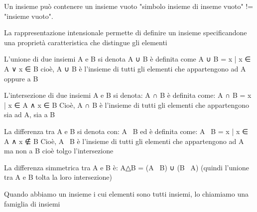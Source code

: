 Un insieme può contenere un insieme vuoto "simbolo insieme di inseme vuoto" != "insieme vuoto".

La rappresentazione intensionale permette di definire un insieme specificandone una proprietà
caratteristica che distingue gli elementi


L’unione di due insiemi A e B si denota A ∪ B
è definita come A ∪ B = {x | x ∈ A ∨ x ∈ B} 
cioè, A ∪ B è l’insieme di tutti gli elementi che appartengono ad A oppure a B 


L’intersezione di due insiemi A e B si denota: A ∩ B
è definita come:
A ∩ B = {x | x ∈ A ∧ x ∈ B}
Cioè, A ∩ B è l’insieme di tutti gli elementi che appartengono sia ad A, sia a B

La differenza tra A e B si denota con: A \ B
ed è definita come:
A \ B = { x | x ∈ A ∧ x ∉ B }
Cioè, A \ B è l’insieme di tutti gli elementi che appartengono ad A ma non a B 
cioè tolgo l’intersezione 


La differenza simmetrica tra A e B è:
A△B = (A \ B) ∪ (B \ A) (quindi l'unione tra A e B tolta la loro intersezione)

Quando abbiamo un insieme i cui elementi sono tutti insiemi, lo chiamiamo una
famiglia di insiemi 
